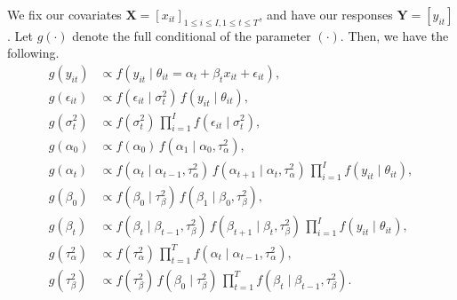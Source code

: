\documentclass[10pt]{article}
\begin{document}
    We fix our covariates $\bm{X} = [x_{it}]_{1 \leq i \leq I, 1 \leq t \leq
    T}$, and have our responses $\bm{Y} = [y_{it}]$.
    Let $g(\cdot)$ denote the full conditional of the parameter $(\cdot)$.
    Then, we have the following.
    \begin{align*}
        g(y_{it}) &\propto f(y_{it} \mid \theta_{it} = \alpha_t + \beta_t x_{it} + \epsilon_{it}), \\
        g(\epsilon_{it}) &\propto f(\epsilon_{it}\mid \sigma^2_t)\, f(y_{it}\mid \theta_{it}), \\
        g(\sigma^2_t) &\propto f(\sigma^2_t)\, \prod_{i = 1}^I f(\epsilon_{it}\mid \sigma^2_t), \\
        g(\alpha_0) &\propto f(\alpha_0)\, f(\alpha_1\mid \alpha_0, \tau^2_\alpha), \\
        g(\alpha_t) &\propto f(\alpha_t\mid \alpha_{t - 1}, \tau^2_\alpha)\, f(\alpha_{t + 1}\mid \alpha_t, \tau^2_\alpha)\,\prod_{i = 1}^I f(y_{it}\mid \theta_{it}), \\
        g(\beta_0) &\propto f(\beta_0\mid \tau^2_\beta)\, f(\beta_1\mid \beta_0, \tau^2_\beta), \\
        g(\beta_t) &\propto f(\beta_t\mid \beta_{t - 1}, \tau^2_\beta)\, f(\beta_{t + 1}\mid \beta_t, \tau^2_\beta)\, \prod_{i = 1}^I f(y_{it}\mid \theta_{it}), \\
        g(\tau^2_\alpha) &\propto f(\tau^2_\alpha)\, \prod_{t = 1}^T f(\alpha_t\mid \alpha_{t - 1}, \tau^2_\alpha), \\
        g(\tau^2_\beta) &\propto f(\tau^2_\beta)\, f(\beta_0\mid \tau^2_\beta)\, \prod_{t = 1}^T f(\beta_t\mid \beta_{t - 1}, \tau^2_\beta).
    \end{align*}
\end{document}

